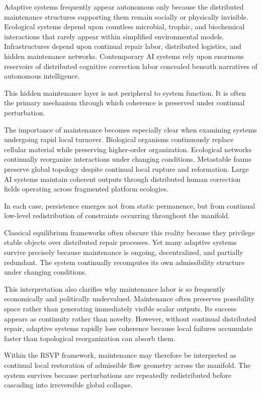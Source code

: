 \documentclass[11pt,a4paper]{article}
\begin{document}
Adaptive systems frequently appear autonomous only because the distributed maintenance structures supporting them remain socially or physically invisible. Ecological systems depend upon countless microbial, trophic, and biochemical interactions that rarely appear within simplified environmental models. Infrastructures depend upon continual repair labor, distributed logistics, and hidden maintenance networks. Contemporary AI systems rely upon enormous reservoirs of distributed cognitive correction labor concealed beneath narratives of autonomous intelligence.

This hidden maintenance layer is not peripheral to system function. It is often the primary mechanism through which coherence is preserved under continual perturbation.

The importance of maintenance becomes especially clear when examining systems undergoing rapid local turnover. Biological organisms continuously replace cellular material while preserving higher-order organization. Ecological networks continually reorganize interactions under changing conditions. Metastable foams preserve global topology despite continual local rupture and reformation. Large AI systems maintain coherent outputs through distributed human correction fields operating across fragmented platform ecologies.

In each case, persistence emerges not from static permanence, but from continual low-level redistribution of constraints occurring throughout the manifold.

Classical equilibrium frameworks often obscure this reality because they privilege stable objects over distributed repair processes. Yet many adaptive systems survive precisely because maintenance is ongoing, decentralized, and partially redundant. The system continually recomputes its own admissibility structure under changing conditions.

This interpretation also clarifies why maintenance labor is so frequently economically and politically undervalued. Maintenance often preserves possibility space rather than generating immediately visible scalar outputs. Its success appears as continuity rather than novelty. However, without continual distributed repair, adaptive systems rapidly lose coherence because local failures accumulate faster than topological reorganization can absorb them.

Within the RSVP framework, maintenance may therefore be interpreted as continual local restoration of admissible flow geometry across the manifold. The system survives because perturbations are repeatedly redistributed before cascading into irreversible global collapse.
\end{document}
